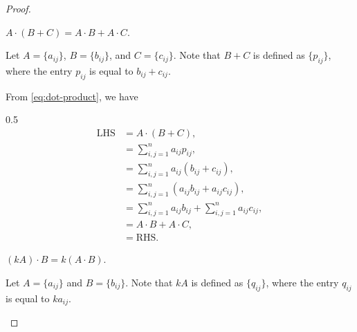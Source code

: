 \begin{enumerate}
\begin{enumerate}
\begin{proof}
                    \smallskip

                    \begin{claim}
                        $A \cdot (B + C) = A \cdot B + A \cdot C$.
                    \end{claim}

                    \begin{subproof}
                        Let $A = \{a_{ij}\}$, $B = \{b_{ij}\}$, and $C = \{c_{ij}\}$.
                        Note that $B + C$ is defined as $\{p_{ij}\}$, where the entry $p_{ij}$ is equal to $b_{ij} + c_{ij}$.

                        From \cref{eq:dot-product}, we have
                        \begin{spreadlines}{0.5\baselineskip}
                            \begin{align*}
                                \text{LHS} &= A \cdot (B + C), \\
                                &= \sum_{i, j = 1}^n a_{ij} p_{ij}, \\
                                &= \sum_{i, j = 1}^n a_{ij} (b_{ij} + c_{ij}), \\
                                &= \sum_{i, j = 1}^n \left(a_{ij} b_{ij} + a_{ij} c_{ij}\right), \\
                                &= \sum_{i, j = 1}^n a_{ij} b_{ij} + \sum_{i, j = 1}^n a_{ij} c_{ij}, \\
                                &= A \cdot B + A \cdot C, \\
                                &= \text{RHS}.
                            \end{align*}
                        \end{spreadlines}
                    \end{subproof}

                    \smallskip

                    \begin{claim}
                        $(k A) \cdot B = k (A \cdot B)$.
                    \end{claim}

                    \begin{subproof}
                        Let $A = \{a_{ij}\}$ and $B = \{b_{ij}\}$. Note that $k A$ is defined as $\{q_{ij}\}$, where the entry $q_{ij}$ is equal to $k a_{ij}$.


\end{subproof}
\end{proof}
\end{enumerate}
\end{enumerate}
